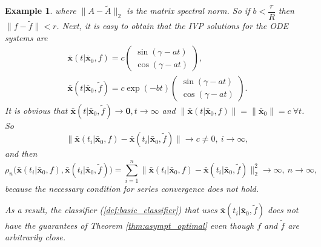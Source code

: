 \documentclass[referee, pdflatex, sn-mathphys-num]{sn-jnl}
\theoremstyle{definition}
\theoremstyle{plain}
\newtheorem{Ex}{Example}
\newcommand{\bbx}{\ensuremath{\bar{\mathbf{x}}}}
\begin{document}
\begin{appendices}
\begin{Ex}
			where $\lVert A - \tilde{A} \rVert_2$ is the matrix spectral norm. So if $b < \dfrac{r}{R} $ then $\lVert f - \tilde{f} \rVert < r$.
			Next, it is easy to obtain that the IVP solutions for the ODE systems are
			\begin{gather*}
				\bbx(t | \bbx_0, f) = c \begin{pmatrix}
					\sin (\gamma - at) \\
					\cos (\gamma - at)
				\end{pmatrix}, \\
				\bbx(t | \bbx_0, \tilde{f}) = c \exp(-bt) \begin{pmatrix}
					\sin (\gamma - at) \\
					\cos (\gamma - at)
				\end{pmatrix}.
			\end{gather*}
			It is obvious that $\bbx(t | \bbx_0, \tilde{f}) \to \mathbf{0}, t \to \infty$ and $\lVert \bbx(t | \bbx_0, f) \rVert = \lVert \bbx_0\rVert = c \   \forall t$. So
			\begin{equation*}
				\lVert \bbx(t_i | \bbx_0, f) - \bbx(t_i | \bbx_0, \tilde{f}) \rVert \to c \not=0, \ i \to \infty,
			\end{equation*}
			and then
			\begin{equation*}
				\rho_n\big( \bbx(t_i | \bbx_0, f), \bbx(t_i | \bbx_0, \tilde{f}) \big) = \sum\limits_{i=1}^n \lVert \bbx(t_i | \bbx_0, f) -  \bbx(t_i | \bbx_0, \tilde{f}) \rVert_2^2 \to \infty, \ n \to \infty,
			\end{equation*}
			because the necessary condition for series convergence does not hold.
			
			As a result, the classifier (\ref{def:basic_classifier}) that uses $\bbx(t_i | \bbx_0, \tilde{f})$ does not have the guarantees of Theorem \ref{thm:asympt_optimal} even though $f$ and $\tilde{f}$ are arbitrarily close.
		\end{Ex}
		
	\end{appendices}
	
\end{document}
